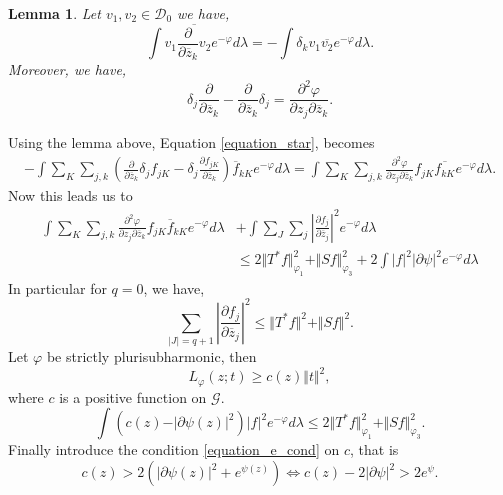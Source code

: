 \documentclass{article}
\newtheorem{lemma}{Lemma}[section]
\newcommand{\norm}[1]{\Vert #1 \Vert}
\newcommand{\G}[0]{\mathcal{G}}
\newcommand{\pd}[2]{{\frac {\partial#1} {\partial#2}}}
\begin{document}
\begin{lemma}
  Let $v_1,v_2\in\mathcal{D}_0$ we have,
  \begin{equation*}
    \int v_1\overline{\pd{}{\overline{z}_k}v_2}e^{-\varphi}d\lambda = -\int\delta_kv_1\overline{v_2}e^{-\varphi}d\lambda.
  \end{equation*}
  Moreover, we have,
  \begin{equation*}
    \delta_j\pd{}{\overline{z}_k}-\pd{}{\overline{z}_k}\delta_j={\frac {\partial^2\varphi}{\partial z_j\partial\overline{z}_k}}.
  \end{equation*}
\end{lemma}
Using the lemma above, Equation \eqref{equation_star}, becomes 
\begin{align*}
  -\int\sum_{K}\sum_{j,k}\left(\pd{}{\overline{z}_k}\delta_jf_{jK}-\delta_j\pd{f_{jK}}{\overline{z}_k}\right)\overline{f}_{kK}e^{-\varphi}d\lambda=\int\sum_{K}\sum_{j,k}{\frac {\partial^2\varphi}{\partial z_j\partial\overline{z}_k}}f_{jK}\overline{f_{kK}}e^{-\varphi}d\lambda.
\end{align*}
Now this leads us to 
\begin{align*}\label{equation_double_star}
\int\sum_{K}\sum_{j,k}{\frac {\partial^2\varphi} {\partial z_j\partial\overline{z}_k}}f_{jK}\overline{f}_{kK}e^{-\varphi}d\lambda&+\int\sum_J\sum_j\left\vert\pd{f_j}{\overline{z}_j}\right\vert^2e^{-\varphi}d\lambda \tag{$\ast\ast$}\\
&\leq 2\norm{T^*f}_{\varphi_1}^2+\norm{Sf}_{\varphi_3}^2+2\int\vert f\vert^2\vert\partial\psi\vert^2e^{-\varphi}d\lambda
\end{align*}
In particular for $q=0$, we have,
\begin{equation*}
  \sum_{\vert J\vert = q+1}\left\vert\pd{f_j}{\overline{z}_j}\right\vert^2\leq\norm{T^*f}^2+\norm{Sf}^2.
\end{equation*}
Let $\varphi$ be strictly plurisubharmonic, then 
\begin{equation*}
  L_\varphi(z;t)\geq c(z)\norm{t}^2,
\end{equation*}
where $c$ is a positive function on $\G$.
\begin{equation*}
  \int(c(z)-\vert\partial\psi(z)\vert^2)\vert f\vert^2 e^{-\varphi}d\lambda\leq 2\norm{T^*f}^2_{\varphi_1}+\norm{Sf}^2_{\varphi_3}.\tag{$\ast\ast\ast$}\label{equation_triple_star}
\end{equation*}
Finally introduce the condition \eqref{equation_e_cond} on $c$, that is 
\begin{equation*}
c(z)>2(\vert\partial \psi(z)\vert^2+e^{\psi(z)})\Leftrightarrow c(z)-2\vert\partial\psi\vert^2>2e^{\psi}.
\end{equation*}
\end{document}
